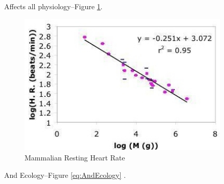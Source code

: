 \documentclass[]{article}
\begin{document}
Affects all physiology--Figure \ref{fig:MammalianRestingHeartRate}\cite{savage2004predominance}.

\begin{figure}[H]
	\caption{Mammalian Resting Heart Rate}\label{fig:MammalianRestingHeartRate}
	\includegraphics[width=0.9\textwidth]{MammalianRestingHeartRate}
\end{figure}

And Ecology--Figure \ref{eq:AndEcology} \cite{ernest2003thermodynamic}.
\end{document}

